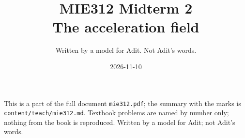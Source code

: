 
\title{MIE312 Midterm 2\\[0.3em]\large The acceleration field}
\author{Written by a model for Adit. Not Adit's words.}
\date{2026-11-10}

\maketitle
\begin{sloppypar}\noindent\small This is a part of the full document \texttt{mie312.pdf}; the summary with the marks is \texttt{content/teach/mie312.md}. Textbook problems are named by number only; nothing from the book is reproduced. Written by a model for Adit; not Adit's words.\normalsize\end{sloppypar}



